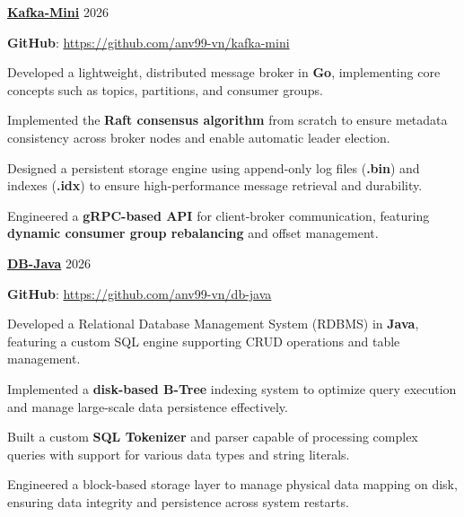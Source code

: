 \begin{cventries} %

  \cvsimpleentry
    {\href{https://github.com/anv99-vn/kafka-mini}{\textbf{Kafka-Mini}}} %
    {2026} %
    {
      \begin{cvitems} %
        \item {\textbf{GitHub}: \href{https://github.com/anv99-vn/kafka-mini}{https://github.com/anv99-vn/kafka-mini}}
        \item {Developed a lightweight, distributed message broker in \textbf{Go}, implementing core concepts such as topics, partitions, and consumer groups.}
        \item {Implemented the \textbf{Raft consensus algorithm} from scratch to ensure metadata consistency across broker nodes and enable automatic leader election.}
        \item {Designed a persistent storage engine using append-only log files (\textbf{.bin}) and indexes (\textbf{.idx}) to ensure high-performance message retrieval and durability.}
        \item {Engineered a \textbf{gRPC-based API} for client-broker communication, featuring \textbf{dynamic consumer group rebalancing} and offset management.}
      \end{cvitems}
    }

  \cvsimpleentry
    {\href{https://github.com/anv99-vn/db-java}{\textbf{DB-Java}}} %
    {2026} %
    {
      \begin{cvitems} %
        \item {\textbf{GitHub}: \href{https://github.com/anv99-vn/db-java}{https://github.com/anv99-vn/db-java}}
        \item {Developed a Relational Database Management System (RDBMS) in \textbf{Java}, featuring a custom SQL engine supporting CRUD operations and table management.}
        \item {Implemented a \textbf{disk-based B-Tree} indexing system to optimize query execution and manage large-scale data persistence effectively.}
        \item {Built a custom \textbf{SQL Tokenizer} and parser capable of processing complex queries with support for various data types and string literals.}
        \item {Engineered a block-based storage layer to manage physical data mapping on disk, ensuring data integrity and persistence across system restarts.}
      \end{cvitems}
    }

\end{cventries}
